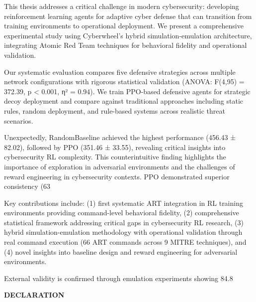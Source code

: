 \documentclass[12pt,twoside]{article}
\theoremstyle{definition}
\theoremstyle{plain}
\begin{document}
\vspace{1em} %

This thesis addresses a critical challenge in modern cybersecurity: developing reinforcement learning agents for adaptive cyber defense that can transition from training environments to operational deployment. We present a comprehensive experimental study using Cyberwheel's hybrid simulation-emulation architecture, integrating Atomic Red Team techniques for behavioral fidelity and operational validation.

Our systematic evaluation compares five defensive strategies across multiple network configurations with rigorous statistical validation (ANOVA: F(4,95) = 372.39, p < 0.001, η² = 0.94). We train PPO-based defensive agents \citep{schulman2017proximal} for strategic decoy deployment and compare against traditional approaches including static rules, random deployment, and rule-based systems across realistic threat scenarios.

Unexpectedly, RandomBaseline achieved the highest performance (456.43 ± 82.02), followed by PPO (351.46 ± 33.55), revealing critical insights into cybersecurity RL complexity. This counterintuitive finding highlights the importance of exploration in adversarial environments and the challenges of reward engineering in cybersecurity contexts. PPO demonstrated superior consistency (63%

Key contributions include: (1) first systematic ART integration in RL training environments providing command-level behavioral fidelity, (2) comprehensive statistical framework addressing critical gaps in cybersecurity RL research, (3) hybrid simulation-emulation methodology with operational validation through real command execution (66 ART commands across 9 MITRE techniques), and (4) novel insights into baseline design and reward engineering for adversarial environments.

External validity is confirmed through emulation experiments showing 84.8%

\begin{center}
\large\textbf{DECLARATION}
\end{center}
\end{document}
